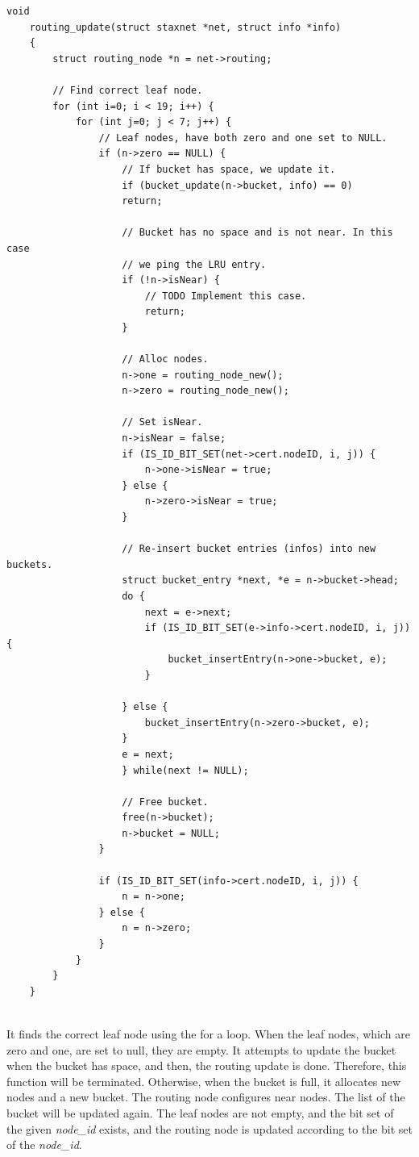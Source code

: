 \lstset{language=C} 
\begin{lstlisting}[caption=The procedure to deal with input data]
	void
	routing_update(struct staxnet *net, struct info *info)
	{
		struct routing_node *n = net->routing;
		
		// Find correct leaf node.
		for (int i=0; i < 19; i++) {
			for (int j=0; j < 7; j++) {
				// Leaf nodes, have both zero and one set to NULL.
				if (n->zero == NULL) {
					// If bucket has space, we update it.
					if (bucket_update(n->bucket, info) == 0)
					return;
					
					// Bucket has no space and is not near. In this case
					// we ping the LRU entry.
					if (!n->isNear) {
						// TODO Implement this case.
						return;
					}
					
					// Alloc nodes.
					n->one = routing_node_new();
					n->zero = routing_node_new();
					
					// Set isNear.
					n->isNear = false;
					if (IS_ID_BIT_SET(net->cert.nodeID, i, j)) {
						n->one->isNear = true;
					} else {
						n->zero->isNear = true;
					}
					
					// Re-insert bucket entries (infos) into new buckets.
					struct bucket_entry *next, *e = n->bucket->head;
					do {
						next = e->next;
						if (IS_ID_BIT_SET(e->info->cert.nodeID, i, j)) {
							bucket_insertEntry(n->one->bucket, e);
						} 
	
					} else {
						bucket_insertEntry(n->zero->bucket, e);
					}
					e = next;
					} while(next != NULL);

					// Free bucket.
					free(n->bucket);
					n->bucket = NULL;
				}

				if (IS_ID_BIT_SET(info->cert.nodeID, i, j)) {
					n = n->one;
				} else {
					n = n->zero;
				}
			}
		}
	}


\end{lstlisting}

It finds the correct leaf node using the for a loop. When the leaf nodes, which are zero and one, are set to null, they are empty. It attempts to update the bucket when the bucket has space, and then, the routing update is done. Therefore, this function will be terminated. Otherwise, when the bucket is full, it allocates new nodes and a new bucket. The routing node configures near nodes. The list of the bucket will be updated again. The leaf nodes are not empty, and the bit set of the given \textit{node\_id} exists, and the routing node is updated according to the bit set of the \textit{node\_id}. 

